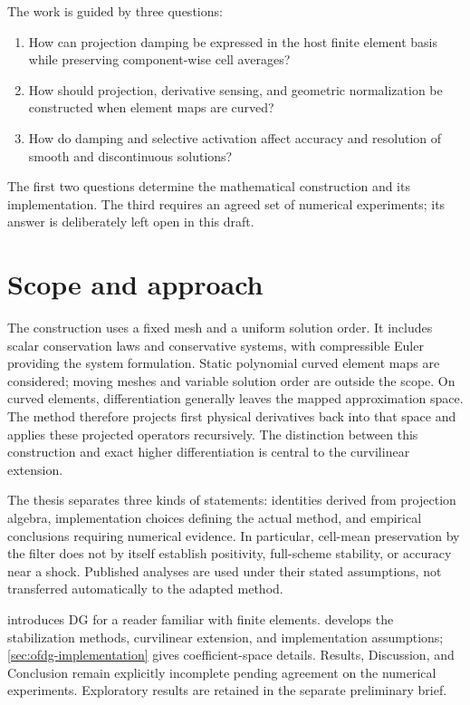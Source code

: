 The work is guided by three questions:
\begin{enumerate}
\item How can projection damping be expressed in the host finite element basis
while preserving component-wise cell averages?
\item How should projection, derivative sensing, and geometric normalization
be constructed when element maps are curved?
\item How do damping and selective activation affect accuracy and resolution
of smooth and discontinuous solutions?
\end{enumerate}
The first two questions determine the mathematical construction and its
implementation. The third requires an agreed set of numerical experiments;
its answer is deliberately left open in this draft.

\section{Scope and approach}
The construction uses a fixed mesh and a uniform solution order. It includes
scalar conservation laws and conservative systems, with compressible Euler
providing the system formulation. Static polynomial curved element maps are
considered; moving meshes and variable solution order are outside the scope.
On curved elements, differentiation generally leaves the mapped approximation
space. The method therefore projects first physical derivatives back into that
space and applies these projected operators recursively. The distinction
between this construction and exact higher differentiation is central to the
curvilinear extension.

The thesis separates three kinds of statements: identities derived from
projection algebra, implementation choices defining the actual method, and
empirical conclusions requiring numerical evidence. In particular, cell-mean
preservation by the filter does not by itself establish positivity, full-scheme
stability, or accuracy near a shock. Published analyses are used under their
stated assumptions, not transferred automatically to the adapted method.

 introduces DG for a reader familiar with finite elements.
 develops the stabilization methods, curvilinear extension,
and implementation assumptions; \cref{sec:ofdg-implementation} gives
coefficient-space details. Results, Discussion, and Conclusion remain explicitly
incomplete pending agreement on the numerical experiments. Exploratory results
are retained in the separate preliminary brief.
